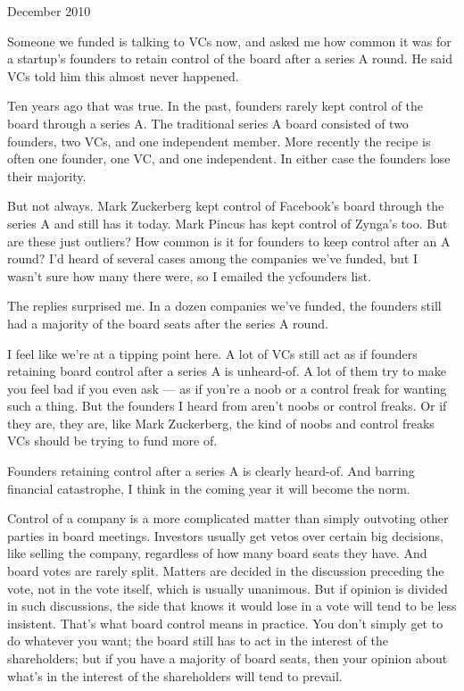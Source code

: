December 2010

Someone we funded is talking to VCs now, and asked me how common it was
for a startup's founders to retain control of the board after a series A
round. He said VCs told him this almost never happened.

Ten years ago that was true. In the past, founders rarely kept control
of the board through a series A. The traditional series A board
consisted of two founders, two VCs, and one independent member. More
recently the recipe is often one founder, one VC, and one independent.
In either case the founders lose their majority.

But not always. Mark Zuckerberg kept control of Facebook's board through
the series A and still has it today. Mark Pincus has kept control of
Zynga's too. But are these just outliers? How common is it for founders
to keep control after an A round? I'd heard of several cases among the
companies we've funded, but I wasn't sure how many there were, so I
emailed the ycfounders list.

The replies surprised me. In a dozen companies we've funded, the
founders still had a majority of the board seats after the series A
round.

I feel like we're at a tipping point here. A lot of VCs still act as if
founders retaining board control after a series A is unheard-of. A lot
of them try to make you feel bad if you even ask --- as if you're a noob
or a control freak for wanting such a thing. But the founders I heard
from aren't noobs or control freaks. Or if they are, they are, like Mark
Zuckerberg, the kind of noobs and control freaks VCs should be trying to
fund more of.

Founders retaining control after a series A is clearly heard-of. And
barring financial catastrophe, I think in the coming year it will become
the norm.

Control of a company is a more complicated matter than simply outvoting
other parties in board meetings. Investors usually get vetos over
certain big decisions, like selling the company, regardless of how many
board seats they have. And board votes are rarely split. Matters are
decided in the discussion preceding the vote, not in the vote itself,
which is usually unanimous. But if opinion is divided in such
discussions, the side that knows it would lose in a vote will tend to be
less insistent. That's what board control means in practice. You don't
simply get to do whatever you want; the board still has to act in the
interest of the shareholders; but if you have a majority of board seats,
then your opinion about what's in the interest of the shareholders will
tend to prevail.

